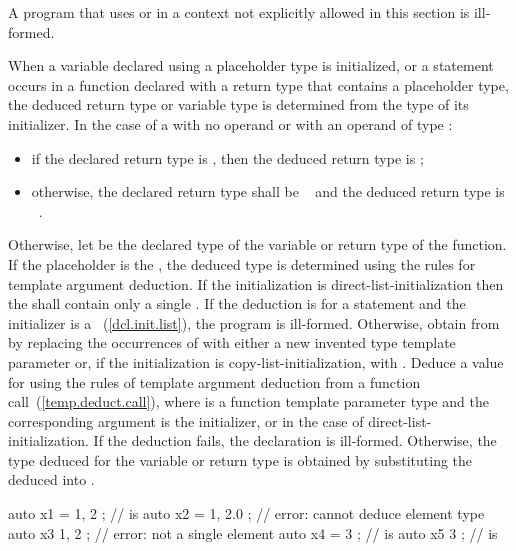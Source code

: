 \pnum
A program that uses  or  in a context not
explicitly allowed in this section is ill-formed.

\pnum
When a variable declared using a placeholder type is initialized, or a
 statement occurs in a function declared with a return type that
contains a placeholder type, the deduced return type or variable type is
determined from the type of its initializer. In the case of a 
with no operand or with an operand of type :
\begin{itemize}
\item if the declared return type is ,
then the deduced return type is ;
\item otherwise, the declared return type shall be \cv\  and
the deduced return type is \cv\ .
\end{itemize}
Otherwise, let  be the declared type of the variable or return type of
the function.
If the placeholder is the  , the
deduced type is determined using the rules for template argument deduction.
If the initialization is direct-list-initialization
then the  shall contain
only a single  .
If the deduction is for a  statement and the initializer is a
~(\ref{dcl.init.list}), the program is
ill-formed. Otherwise, obtain  from
 by replacing the occurrences of  with either a new
invented type template parameter  or,
if the initialization is copy-list-initialization, with
. Deduce a value for  using the rules
of template argument deduction from a function call~(\ref{temp.deduct.call}),
where  is a
function template parameter type and
the corresponding argument is the initializer,
or  in the case of direct-list-initialization.
If the deduction fails, the declaration is ill-formed.
Otherwise, the type deduced for the variable or return type is obtained by
substituting the deduced  into .
\enterexample
\begin{codeblock}
auto x1 = { 1, 2 };         //  is 
auto x2 = { 1, 2.0 };       // error: cannot deduce element type
auto x3{ 1, 2 };            // error: not a single element
auto x4 = { 3 };            //  is 
auto x5{ 3 };               //  is 
\end{codeblock}
\exitexample

